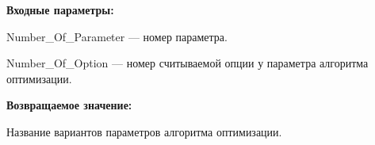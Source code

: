 \textbf{Входные параметры:}

Number\_Of\_Parameter --- номер параметра.
 
    Number\_Of\_Option --- номер считываемой опции у параметра алгоритма оптимизации.

\textbf{Возвращаемое значение:}

Название вариантов параметров алгоритма оптимизации.